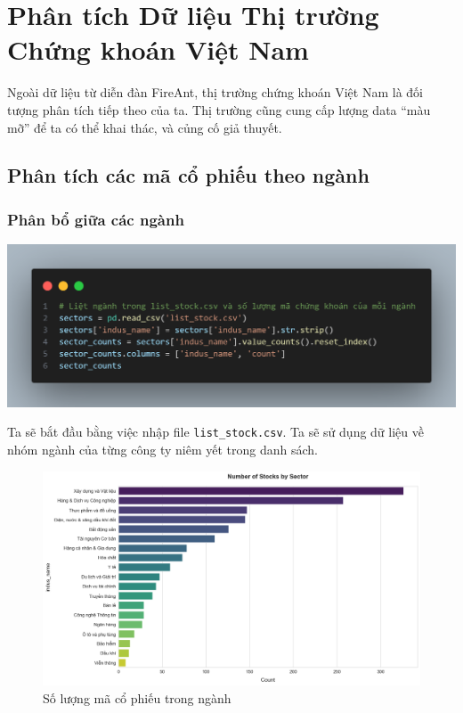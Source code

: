 \chapter{Phân tích Dữ liệu Thị trường Chứng khoán Việt Nam}
\vspace{-2.5em}

Ngoài dữ liệu từ diễn đàn FireAnt, thị trường chứng khoán Việt Nam là đối tượng phân tích tiếp theo của ta. Thị trường cũng cung cấp lượng data ``màu mỡ'' để ta có thể khai thác, và củng cố giả thuyết.

\section{Phân tích các mã cổ phiếu theo ngành}

\subsection{Phân bổ giữa các ngành}
\begin{center} 
\includegraphics[width=0.7\linewidth]{images/code-2.20.png}
\end{center}

Ta sẽ bắt đầu bằng việc nhập file \texttt{list\_stock.csv}. Ta sẽ sử dụng dữ liệu về nhóm ngành của từng công ty niêm yết trong danh sách.
\vspace{-0.5em}
\begin{figure}[H]
    \centering
    \includegraphics[width=1\linewidth]{images/plot-3.8-bar_chart.png}
    \vspace{-2em}
    \caption{Số lượng mã cổ phiếu trong ngành}
    \label{fig:3.1}
\end{figure}

